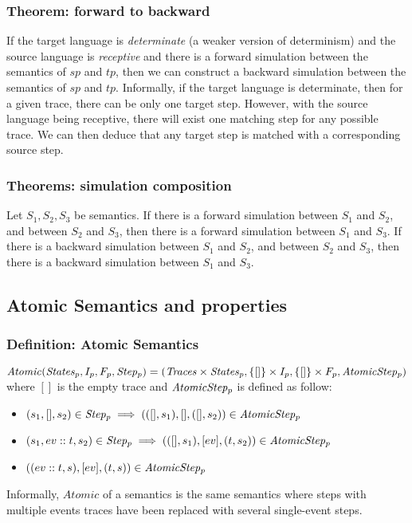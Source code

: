 \backwardforward

\subsubsection{Theorem: forward to backward} If the target language is \textit{determinate} (a weaker version of determinism) and the source language is \textit{receptive} and there is a forward simulation between the semantics of $sp$ and $tp$, then we can construct a backward simulation between the semantics of $sp$ and $tp$. Informally, if the target language is determinate, then for a given trace, there can be only one target step. However, with the source language being receptive, there will exist one matching step for any possible trace. We can then deduce that any target step is matched with a corresponding source step.

\subsubsection{Theorems: simulation composition} Let $S_1,S_2,S_3$ be semantics.
If there is a forward simulation between $S_1$ and $S_2$, and between $S_2$ and $S_3$, then there is a forward simulation between $S_1$ and $S_3$.
If there is a backward simulation between $S_1$ and $S_2$, and between $S_2$ and $S_3$, then there is a backward simulation between $S_1$ and $S_3$.

\subsection{Atomic Semantics and properties}
\subsubsection{Definition: Atomic Semantics} $\mathit{Atomic}(\mathit{States_{p}},I_p,F_p,\mathit{Step_{p}}) = (\mathit{Traces}\times\mathit{States_{p}},\{[]\}\times I_p,\{[]\}\times F_p,\mathit{AtomicStep_{p}})$ where $[]$ is the empty trace and $\mathit{AtomicStep_{p}}$ is defined as follow:
\begin{itemize}
\item $(s_1,[],s_2)\in\mathit{Step_{p}}\implies(([],s_1),[],([],s_2))\in\mathit{AtomicStep_{p}}$
\item $(s_1,ev::t,s_2)\in\mathit{Step_{p}}\implies(([],s_1),[ev],(t,s_2))\in\mathit{AtomicStep_{p}}$
\item $((ev::t,s),[ev],(t,s))\in\mathit{AtomicStep_{p}}$
\end{itemize}
Informally, $\mathit{Atomic}$ of a semantics is the same semantics where steps with multiple events traces have been replaced with several single-event steps.

